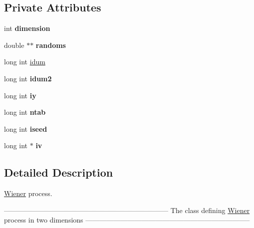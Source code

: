 \subsection*{Private Attributes}
\begin{CompactItemize}
\item 
\hypertarget{classWiener_4bf535cc91f737b904552f51ae1f0ac6}{
int \textbf{dimension}}
\label{classWiener_4bf535cc91f737b904552f51ae1f0ac6}

\item 
\hypertarget{classWiener_09f6069684c20e3eecdddd17602fcf05}{
double $\ast$$\ast$ \textbf{randoms}}
\label{classWiener_09f6069684c20e3eecdddd17602fcf05}

\item 
long int \hyperlink{classWiener_eb32502c4439ae23e7a6922c5d8cd3ba}{idum}
\item 
\hypertarget{classWiener_b06d8f8b4ff3e2c1c099570a66c1ce84}{
long int \textbf{idum2}}
\label{classWiener_b06d8f8b4ff3e2c1c099570a66c1ce84}

\item 
\hypertarget{classWiener_040aaffc7d7758d597582660a09656d3}{
long int \textbf{iy}}
\label{classWiener_040aaffc7d7758d597582660a09656d3}

\item 
\hypertarget{classWiener_f6aa4a6e172025e1ab3f9150e69f865a}{
long int \textbf{ntab}}
\label{classWiener_f6aa4a6e172025e1ab3f9150e69f865a}

\item 
\hypertarget{classWiener_56f50cb31e458ec78b843809ac4a0101}{
long int \textbf{iseed}}
\label{classWiener_56f50cb31e458ec78b843809ac4a0101}

\item 
\hypertarget{classWiener_353476d32254b68fdedaee29f3ae137d}{
long int $\ast$ \textbf{iv}}
\label{classWiener_353476d32254b68fdedaee29f3ae137d}

\end{CompactItemize}


\subsection{Detailed Description}
\hyperlink{classWiener}{Wiener} process. 

----------------------------------------------------------------------- The class defining \hyperlink{classWiener}{Wiener} process in two dimensions ----------------------------------------------------------------------- 

